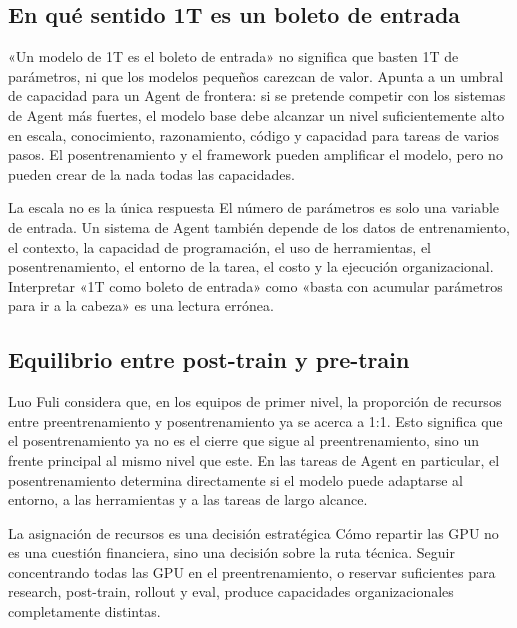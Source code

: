 \documentclass[a4paper]{article}
\begin{document}
\subsection{En qué sentido 1T es un boleto de entrada}

«Un modelo de 1T es el boleto de entrada» no significa que basten 1T de parámetros, ni que los modelos pequeños carezcan de valor. Apunta a un umbral de capacidad para un Agent de frontera: si se pretende competir con los sistemas de Agent más fuertes, el modelo base debe alcanzar un nivel suficientemente alto en escala, conocimiento, razonamiento, código y capacidad para tareas de varios pasos. El posentrenamiento y el framework pueden amplificar el modelo, pero no pueden crear de la nada todas las capacidades.

\begin{warningbox}{La escala no es la única respuesta}
El número de parámetros es solo una variable de entrada. Un sistema de Agent también depende de los datos de entrenamiento, el contexto, la capacidad de programación, el uso de herramientas, el posentrenamiento, el entorno de la tarea, el costo y la ejecución organizacional. Interpretar «1T como boleto de entrada» como «basta con acumular parámetros para ir a la cabeza» es una lectura errónea.
\end{warningbox}

\subsection{Equilibrio entre post-train y pre-train}

Luo Fuli considera que, en los equipos de primer nivel, la proporción de recursos entre preentrenamiento y posentrenamiento ya se acerca a 1:1. Esto significa que el posentrenamiento ya no es el cierre que sigue al preentrenamiento, sino un frente principal al mismo nivel que este. En las tareas de Agent en particular, el posentrenamiento determina directamente si el modelo puede adaptarse al entorno, a las herramientas y a las tareas de largo alcance.

\begin{importantbox}{La asignación de recursos es una decisión estratégica}
Cómo repartir las GPU no es una cuestión financiera, sino una decisión sobre la ruta técnica. Seguir concentrando todas las GPU en el preentrenamiento, o reservar suficientes para research, post-train, rollout y eval, produce capacidades organizacionales completamente distintas.
\end{importantbox}
\end{document}
